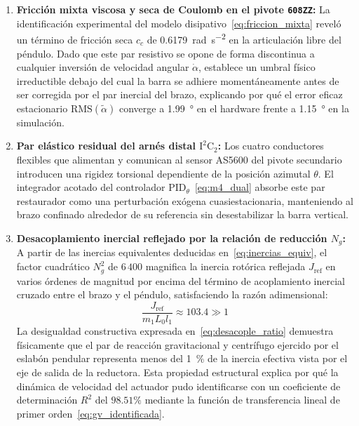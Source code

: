 \begin{enumerate}
    \item \textbf{Fricción mixta viscosa y seca de Coulomb en el pivote \texttt{608ZZ}:} La identificación experimental del modelo disipativo~\eqref{eq:friccion_mixta} reveló un término de fricción seca $c_c$ de \qty{0.6179}{\radian\per\second\squared} en la articulación libre del péndulo. Dado que este par resistivo se opone de forma discontinua a cualquier inversión de velocidad angular $\dot{\alpha}$, establece un umbral físico irreductible debajo del cual la barra se adhiere momentáneamente antes de ser corregida por el par inercial del brazo, explicando por qué el error eficaz estacionario $\mathrm{RMS}(\tilde{\alpha})$ converge a \qty{1.99}{\degree} en el hardware frente a \qty{1.15}{\degree} en la simulación.
    \item \textbf{Par elástico residual del arnés distal $\text{I}^2\text{C}_2$:} Los cuatro conductores flexibles que alimentan y comunican al sensor AS5600 del pivote secundario introducen una rigidez torsional dependiente de la posición azimutal $\theta$. El integrador acotado del controlador $\text{PID}_\theta$~\eqref{eq:m4_dual} absorbe este par restaurador como una perturbación exógena cuasiestacionaria, manteniendo al brazo confinado alrededor de su referencia sin desestabilizar la barra vertical.
    \item \textbf{Desacoplamiento inercial reflejado por la relación de reducción $N_g$:} A partir de las inercias equivalentes deducidas en~\eqref{eq:inercias_equiv}, el factor cuadrático $N_g^2$ de $6\,400$ magnifica la inercia rotórica reflejada $J_{\text{ref}}$ en varios órdenes de magnitud por encima del término de acoplamiento inercial cruzado entre el brazo y el péndulo, satisfaciendo la razón adimensional:
    \begin{equation}
    \frac{J_{\text{ref}}}{m_1 L_0 l_1} \approx 103.4 \gg 1
    \label{eq:desacople_ratio}
    \end{equation}
    La desigualdad constructiva expresada en~\eqref{eq:desacople_ratio} demuestra físicamente que el par de reacción gravitacional y centrífugo ejercido por el eslabón pendular representa menos del \qty{1}{\percent} de la inercia efectiva vista por el eje de salida de la reductora. Esta propiedad estructural explica por qué la dinámica de velocidad del actuador pudo identificarse con un coeficiente de determinación $R^2$ del $98.51\%$ mediante la función de transferencia lineal de primer orden~\eqref{eq:gv_identificada}.
\end{enumerate}

